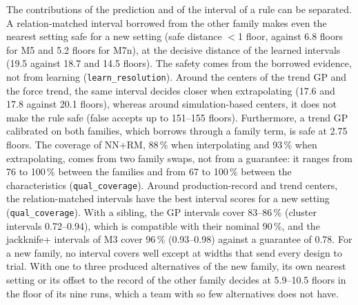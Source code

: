 \documentclass[pdflatex,sn-basic,lineno]{sn-jnl}
\newcommand{\res}[1]{\texttt{#1}}  %
\begin{document}
The contributions of the prediction and of the interval of a rule can be separated. A relation-matched interval borrowed from the other family makes even the nearest setting safe for a new setting (safe distance $<$1 floor, against 6.8 floors for M5 and 5.2 floors for M7n), at the decisive distance of the learned intervals (19.5 against 18.7 and 14.5 floors). The safety comes from the borrowed evidence, not from learning (\res{learn\_resolution}). Around the centers of the trend GP and the force trend, the same interval decides closer when extrapolating (17.6 and 17.8 against 20.1 floors), whereas around simulation-based centers, it does not make the rule safe (false accepts up to 151--155 floors). Furthermore, a trend GP calibrated on both families, which borrows through a family term, is safe at 2.75 floors. The coverage of NN+RM, 88\,\% when interpolating and 93\,\% when extrapolating, comes from two family swaps, not from a guarantee: it ranges from 76 to 100\,\% between the families and from 67 to 100\,\% between the characteristics (\res{qual\_coverage}). Around production-record and trend centers, the relation-matched intervals have the best interval scores \citep{gneiting2007strictly} for a new setting (\res{qual\_coverage}). With a sibling, the GP intervals cover 83--86\,\% (cluster intervals 0.72--0.94), which is compatible with their nominal 90\,\%, and the jackknife+ intervals of M3 cover 96\,\% (0.93--0.98) against a guarantee of 0.78. For a new family, no interval covers well except at widths that send every design to trial. With one to three produced alternatives of the new family, its own nearest setting or its offset to the record of the other family decides at 5.9--10.5 floors in the floor of its nine runs, which a team with so few alternatives does not have.
\end{document}
